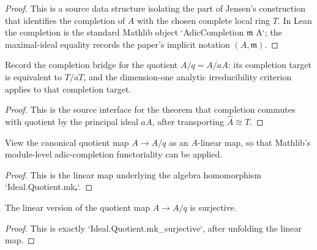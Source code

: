 \begin{proof}
  This is a source data structure isolating the part of Jensen's construction
  that identifies the completion of \(A\) with the chosen complete local ring
  \(T\).  In Lean the completion is the standard Mathlib object
  `AdicCompletion \(\mathfrak m\) A`; the maximal-ideal equality records the
  paper's implicit notation \((A,\mathfrak m)\).
\end{proof}

\begin{definition}
  \label{def:quotient_completion_witness}
  Record the completion bridge for the quotient \(A/q=A/aA\): its completion
  target is equivalent to \(T/aT\), and the dimension-one analytic
  irreducibility criterion applies to that completion target.
\end{definition}

\begin{proof}
  This is the source interface for the theorem that completion commutes with
  quotient by the principal ideal \(aA\), after transporting
  \(\widehat A\cong T\).
\end{proof}

\begin{definition}
  \label{def:quotient_linear_map}
  View the canonical quotient map \(A\to A/q\) as an \(A\)-linear map, so that
  Mathlib's module-level adic-completion functoriality can be applied.
\end{definition}

\begin{proof}
  This is the linear map underlying the algebra homomorphism
  `Ideal.Quotient.mkₐ`.
\end{proof}

\begin{lemma}
  \label{lem:quotient_mk_linear_surjective}
  The linear version of the quotient map \(A\to A/q\) is surjective.
\end{lemma}

\begin{proof}
  This is exactly `Ideal.Quotient.mk_surjective`, after unfolding the linear
  map.
\end{proof}

